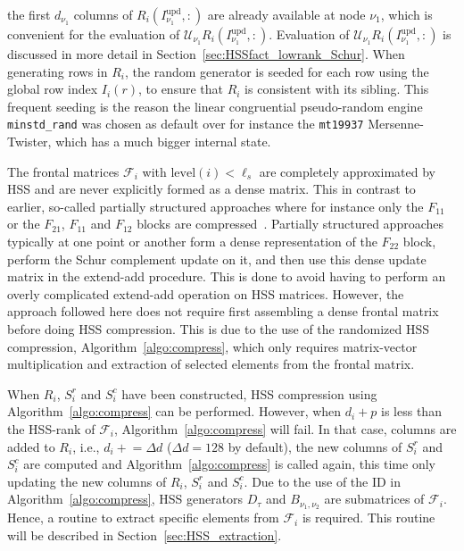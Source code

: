 \documentclass{article}
\begin{document}
the first $d_{\nu_1}$ columns of $R_i(I^{\mathrm{upd}}_{\nu_1},:)$ are
already available at node $\nu_{1}$, which is convenient for the
evaluation of $\mathcal{U}_{\nu_1} R_i(I^{\mathrm{upd}}_{\nu_1},:)$.
Evaluation of $\mathcal{U}_{\nu_1} R_i(I^{\mathrm{upd}}_{\nu_1},:)$ is
discussed in more detail in
Section~\ref{sec:HSSfact_lowrank_Schur}. When generating rows in
$R_i$, the random generator is seeded for each row using the global
row index $I_i(r)$, to ensure that $R_i$ is consistent with its
sibling. This frequent seeding is the reason the linear congruential
pseudo-random engine \verb+minstd_rand+ was chosen as default over for
instance the \verb+mt19937+ Mersenne-Twister, which has a much bigger
internal state.


The frontal matrices $\mathcal{F}_i$ with $\mathrm{level}(i) < \ell_s$
are completely approximated by HSS and are never explicitly formed as
a dense matrix. This in contrast to earlier, so-called partially
structured approaches where for instance only the $F_{11}$ or the
$F_{21}$, $F_{11}$ and $F_{12}$ blocks are
compressed~\cite{wang2014parallel}. Partially structured approaches
typically at one point or another form a dense representation of the
$F_{22}$ block, perform the Schur complement update on it, and then
use this dense update matrix in the extend-add procedure. This is done
to avoid having to perform an overly complicated extend-add operation
on HSS matrices. However, the approach followed here does not require
first assembling a dense frontal matrix before doing HSS
compression. This is due to the use of the randomized HSS compression,
Algorithm~\ref{algo:compress}, which only requires matrix-vector
multiplication and extraction of selected elements from the frontal
matrix.

When $R_i$, $S^r_i$ and $S^c_i$ have been constructed, HSS compression
using Algorithm~\ref{algo:compress} can be performed. However, when
$d_i+p$ is less than the HSS-rank of $\mathcal{F}_i$,
Algorithm~\ref{algo:compress} will fail. In that case, columns are
added to $R_i$, i.e., $d_i \mathrel{+}= \Delta d$ ($\Delta d = 128$ by
default), the new columns of $S_i^r$ and $S_i^c$ are computed and
Algorithm~\ref{algo:compress} is called again, this time only updating
the new columns of $R_i$, $S_i^r$ and $S_i^c$. Due to the use of the
ID in Algorithm~\ref{algo:compress}, HSS generators $D_\tau$ and
$B_{\nu_1,\nu_2}$ are submatrices of $\mathcal{F}_i$. Hence, a routine
to extract specific elements from $\mathcal{F}_i$ is required. This
routine will be described in Section~\ref{sec:HSS_extraction}.
\end{document}
